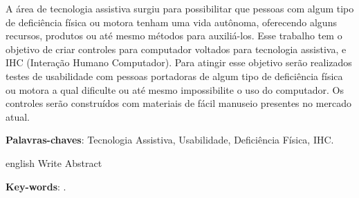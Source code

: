 \documentclass[
	12pt,			%
	openright,		%
	oneside,			%
	a4paper,			%
	chapter=TITLE,		%
	english,			%
	brazil,			%
	]{abntex2}
\begin{document}

%
%
%
%



\begin{resumo}
	A área de tecnologia assistiva surgiu para possibilitar que pessoas com algum tipo de deficiência física ou motora tenham uma vida autônoma, oferecendo alguns recursos, produtos ou até mesmo métodos para auxiliá-los. Esse trabalho tem o objetivo de criar controles para computador voltados para tecnologia assistiva, e IHC (Interação Humano Computador). Para atingir esse objetivo serão realizados testes de usabilidade com pessoas portadoras de algum tipo de deficiência física ou motora a qual dificulte ou até mesmo impossibilite o uso do computador. Os controles serão construídos com materiais de fácil manuseio presentes no mercado atual.

\vspace{\onelineskip}
\noindent
\textbf{Palavras-chaves}: Tecnologia Assistiva, Usabilidade, Deficiência Física, IHC.
\end{resumo}

\begin{resumo}[Abstract]
\begin{otherlanguage*}{english}
Write Abstract

\vspace{\onelineskip}
\noindent
\textbf{Key-words}: .
\end{otherlanguage*}
\end{resumo}
\end{document}
